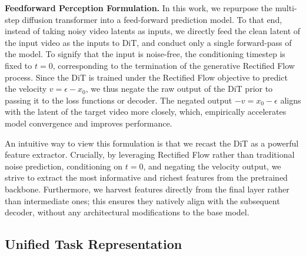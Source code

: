 \documentclass[11pt, a4paper, logo, onecolumn]{googledeepmind}
\begin{document}
\noindent\textbf{{Feedforward Perception Formulation.}} 
In this work, we repurpose the multi-step diffusion transformer into a feed-forward prediction model. To that end, instead of taking noisy video latents as inputs, we directly feed the clean latent of the input video as the inputs to DiT, and conduct only a single forward-pass of the model. 
To signify that the input is noise-free, the conditioning timestep is fixed to $t=0$, corresponding to the termination of the generative Rectified Flow process.
Since the DiT is trained under the Rectified Flow objective to predict the velocity $v = \epsilon - x_0$, we thus negate the raw output of the DiT prior to passing it to the loss functions or decoder. The negated output $-v = x_0 - \epsilon$ aligns with the latent of the target video more closely, which, empirically accelerates model convergence and improves performance. 

\noindent An intuitive way to view this formulation is that we recast the DiT as a powerful feature extractor. Crucially, by leveraging Rectified Flow rather than traditional noise prediction, conditioning on $t=0$, and negating the velocity output, we strive to extract the most informative and richest features from the pretrained backbone.
Furthermore, we harvest features directly from the final layer rather than intermediate ones; this ensures they natively align with the subsequent decoder, without any architectural modifications to the base model. 



    





\subsection{Unified Task Representation}
\label{sec: representation}
\end{document}
